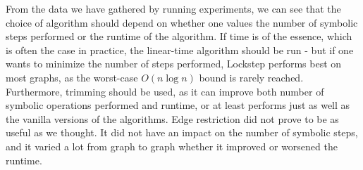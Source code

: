 \documentclass[../master/master.tex]{subfiles}
\begin{document}
From the data we have gathered by running experiments, we can see that the choice of algorithm should depend on whether one values the number of symbolic steps performed or the runtime of the algorithm. If time is of the essence, which is often the case in practice, the linear-time algorithm should be run - but if one wants to minimize the number of steps performed, Lockstep performs best on most graphs, as the worst-case $O(n\log n)$ bound is rarely reached. Furthermore, trimming should be used, as it can improve both number of symbolic operations performed and runtime, or at least performs just as well as the vanilla versions of the algorithms. Edge restriction did not prove to be as useful as we thought. It did not have an impact on the number of symbolic steps, and it varied a lot from graph to graph whether it improved or worsened the runtime.

\end{document}
